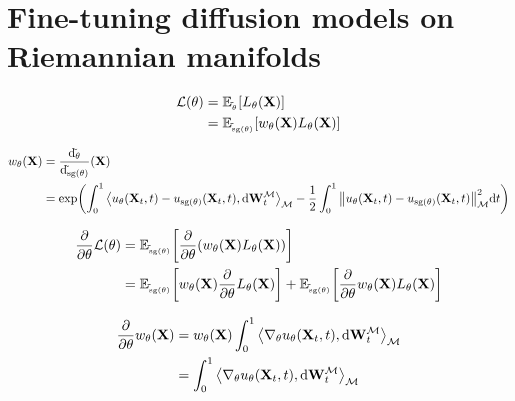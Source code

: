 \documentclass{article}
\theoremstyle{plain}
\theoremstyle{definition}
\theoremstyle{remark}
\let\P\relax
\DeclareMathOperator{\P}{\mathbb{P}}
\DeclareMathOperator{\sg}{\mathrm{sg}}
\newcommand{\inner}[2]{\left\langle #1, #2\right\rangle}
\begin{document}
\section{Fine-tuning diffusion models on Riemannian manifolds}

\begin{equation}
    \begin{aligned}
        \mathcal{L}(\theta) & = \mathbb{E}_{\tilde{\P}_\theta} \qty[L_\theta(\mathbf{X})] \\
        & = \mathbb{E}_{\tilde{\P}_{\sg(\theta)}}\qty[w_\theta(\mathbf{X})L_\theta(\mathbf{X})]
    \end{aligned}
\end{equation}

\begin{equation}
    \begin{aligned}
        w_\theta(\mathbf{X}) & = \frac{\dd \tilde{\P}_\theta}{\dd \tilde{\P}_{\sg(\theta)}}(\mathbf{X}) \\
        & = \exp(\int_0^1 \inner{u_\theta(\mathbf{X}_t, t)-u_{\sg(\theta)}(\mathbf{X}_t, t)}{\dd \mathbf{W}_t^\mathcal{M}}_\mathcal{M} -\frac{1}{2}\int_0^1 \norm{u_\theta(\mathbf{X}_t, t)-u_{\sg(\theta)}(\mathbf{X}_t, t)}^2_\mathcal{M} \dd t)
    \end{aligned}
\end{equation}

\begin{equation}
    \begin{aligned}
        \pdv{\theta} \mathcal{L}(\theta) & = \mathbb{E}_{\tilde{\P}_{\sg(\theta)}} \qty[\pdv{\theta} \qty(w_\theta(\mathbf{X})L_\theta(\mathbf{X}))] \\
        & = \mathbb{E}_{\tilde{\P}_{\sg(\theta)}} \qty[w_\theta(\mathbf{X})\pdv{\theta} L_\theta(\mathbf{X})] + \mathbb{E}_{\tilde{\P}_{\sg(\theta)}} \qty[\pdv{\theta} w_\theta(\mathbf{X})L_\theta(\mathbf{X})]
    \end{aligned}
\end{equation}

\begin{equation}
    \begin{aligned}
        \pdv{\theta} w_\theta(\mathbf{X}) & = w_\theta(\mathbf{X})\int_0^1 \inner{\nabla_\theta u_\theta(\mathbf{X}_t, t)}{\dd \mathbf{W}_t^\mathcal{M}}_\mathcal{M} \\
        & = \int_0^1 \inner{\nabla_\theta u_\theta(\mathbf{X}_t, t)}{\dd \mathbf{W}_t^\mathcal{M}}_\mathcal{M}
    \end{aligned}
\end{equation}
\end{document}
